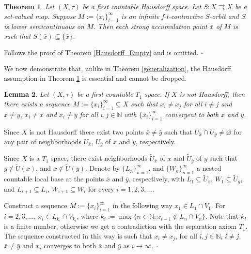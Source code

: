 \documentclass{article}
\renewcommand{\emptyset}{\varnothing}
\newcommand{\N}{\mathbb{N}}
\renewenvironment{proof}
         {\begin{trivlist}\item[
         {\bf Proof.}]}{{\hfill $\square$} \end{trivlist}}
\newtheorem{theo}{Theorem}[section]
\newtheorem{lemma}[theo]{Lemma}
\begin{document}
\begin{theo} \label{Hausdorff_Empty_1} 
Let $(X, \tau)$ be a first countable Hausdorff space. Let $S: X \rightrightarrows X$ be a set-valued map. Suppose $M:=\{x_i\}_{i=1}^{\infty}$ is an infinite f-t-contractive $S$-orbit and $S$ is lower semicontinuous on $M$. Then each strong accumulation point $\bar{x}$ of $M$ is such that $S(\bar{x}) \subseteq \{\bar{x}\}$. 
\end{theo}
\begin{proof} Follows the proof of Theorem \ref{Hausdorff_Empty} and is omitted.
\end{proof}
We now demonstrate that, unlike in Theorem \ref{generalization}, the Hausdorff assumption in Theorem \ref{Hausdorff_Empty_1} is essential and cannot be dropped. 
\begin{lemma} \label{seq_constr} Let $(X, \tau)$ be a first countable $T_1$ space. If $X$ is not Hausdorff, then there exists a sequence $M:=\{x_i\}_{i=1}^{\infty} \subseteq X$ such that $x_i \neq x_{j}$ for all $i \neq j$ and  $\bar{x} \neq \bar{y}$, $x_i \neq \bar{x}$ and $x_i \neq \bar{y}$ for all $i,j \in \N$ with $\{x_i\}_{i=1}^{\infty}$ convergent to both $\bar{x}$ and $\bar{y}$.   
\end{lemma}
\begin{proof}
Since $X$ is not Hausdorff there exist two points $\bar{x} \neq\bar{y}$ such that $U_{\bar{x}} \cap U_{\bar{y}} \neq \emptyset$ for any pair of neighborhoods $U_{\bar{x}}$, $U_{\bar{y}}$ of $\bar{x}$ and $\bar{y}$, respectively. 

Since $X$ is a $T_1$ space, there exist neighborhoods $\tilde{U}_{\bar{x}}$ of $\bar{x}$ and $\tilde{U}_{\bar{y}}$ of $\bar{y}$ such that $\bar{y} \notin \tilde{U}(\bar{x})$, and $\bar{x} \notin \tilde{U}(\bar{y})$. Denote by $\{L_n\}_{n = 1}^{\infty}$, and $\{W_n\}_{n = 1}^{\infty}$ a nested countable local base at the points $\bar{x}$ and $\bar{y}$, respectively, with $L_1 \subseteq \tilde{U}_{\bar{x}}$,  $W_1 \subseteq \tilde{U}_{\bar{y}}$,  and $L_{i+1} \subseteq L_{i}$, $W_{i+1} \subseteq W_{i}$ for every $i=1,2,3,\dots$. 

Construct a sequence $M:=\{x_i\}_{i = 1}^{\infty}$ in the following way $x_1 \in L_1 \cap V_1$. For $i = 2, 3, \dots$, $x_i \in L_{k_i} \cap V_{k_i}$, where $k_i:=\max\{n \in \N: x_{i-1} \notin L_n \cap V_n\}$. Note that $k_i$ is a finite number, otherwise we get a contradiction with the separation axiom $T_1$. The sequence constructed in this way is such that $x_i \neq x_{j}$, for all $i,j \in \N$, $i \neq j$, $\bar{x} \neq \bar{y}$ and $x_i$ converges to both $\bar{x}$ and $\bar{y}$ as $i \rightarrow \infty$. 
\end{proof}
\end{document}
